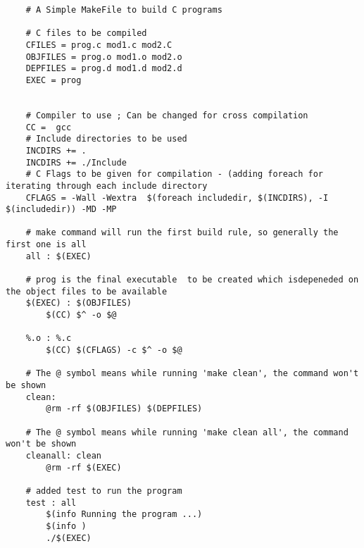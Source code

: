 \documentclass{article}
\begin{document}
\begin{verbatim}
    # A Simple MakeFile to build C programs

    # C files to be compiled
    CFILES = prog.c mod1.c mod2.C
    OBJFILES = prog.o mod1.o mod2.o
    DEPFILES = prog.d mod1.d mod2.d
    EXEC = prog


    # Compiler to use ; Can be changed for cross compilation
    CC =  gcc
    # Include directories to be used
    INCDIRS += . 
    INCDIRS += ./Include
    # C Flags to be given for compilation - (adding foreach for iterating through each include directory
    CFLAGS = -Wall -Wextra  $(foreach includedir, $(INCDIRS), -I $(includedir)) -MD -MP

    # make command will run the first build rule, so generally the first one is all
    all : $(EXEC)

    # prog is the final executable  to be created which isdepeneded on the object files to be available
    $(EXEC) : $(OBJFILES)
        $(CC) $^ -o $@

    %.o : %.c
        $(CC) $(CFLAGS) -c $^ -o $@

    # The @ symbol means while running 'make clean', the command won't be shown 
    clean:
        @rm -rf $(OBJFILES) $(DEPFILES)

    # The @ symbol means while running 'make clean all', the command won't be shown 
    cleanall: clean
        @rm -rf $(EXEC)

    # added test to run the program
    test : all
        $(info Running the program ...)
        $(info )
        ./$(EXEC)
\end{verbatim}
\end{document}
